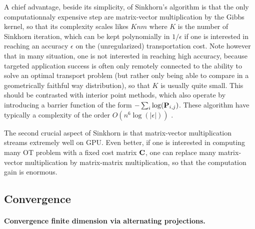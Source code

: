 %

A chief advantage, beside its simplicity, of Sinkhorn's algorithm is that the only computationnaly expensive step are matrix-vector multiplication by the Gibbs kernel, so that its complexity scales likes $Knm$ where $K$ is the number of Sinkhorn iteration, which can be kept polynomially in $1/\epsilon$ if one is interested in reaching an accuracy $\epsilon$ on the (unregularized) transportation cost. Note however that in many situation, one is not interested in reaching high accuracy, because targeted application success is often only remotely connected to the ability to solve an optimal transport problem (but rather only being able to compare in a geometrically faithful way distribution), so that $K$ is usually quite small.
%
This should be contrasted with interior point methods, which also operate by introducing a barrier function of the form $-\sum_i \log(\P_{i,j})$. These algorithm have typically a complexity of the order $O(n^6 \log(|\epsilon|))$ . 

The second crucial aspect of Sinkhorn is that matrix-vector multiplication streams extremely well on GPU. Even better, if one is interested in computing many OT problem with a fixed cost matrix $\C$, one can replace many matrix-vector multiplication by matrix-matrix multiplication, so that the computation gain is enormous. 


\subsection{Convergence}

\paragraph{Convergence finite dimension via alternating projections.}

